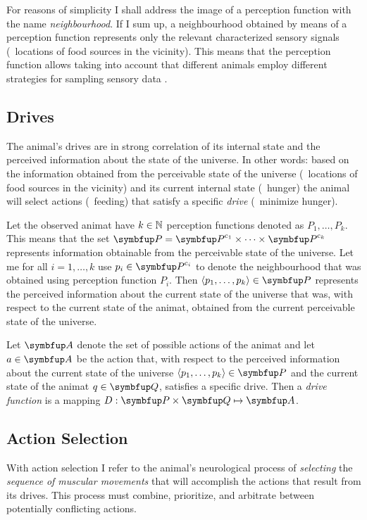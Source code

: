 For reasons of simplicity I shall address the image of a perception function with the name \emph{neighbourhood}. If I sum up, a neighbourhood obtained by means of a perception function represents only the relevant characterized sensory signals (\eg\ locations of food sources in the vicinity). This means that the perception function allows taking into account that different animals employ different strategies for sampling sensory data \cite{cliff:1993}. 

\subsection{Drives}
The animal's drives are in strong correlation of its internal state and the perceived information about the state of the universe. In other words: based on the information obtained from the perceivable state of the universe (\eg\ locations of food sources in the vicinity) and its current internal state (\eg\ hunger) the animal will select actions (\eg\ feeding) that satisfy a specific \emph{drive} (\eg\ minimize hunger).

Let the observed animat have $k \in \mathbb{N}$ perception functions denoted as $P_1,\ldots,P_k$. This means that the set $\set{P}=\set{P}^{\mathrm{c}_1} \times \cdots \times \set{P}^{\mathrm{c}_k}$ represents information obtainable from the perceivable state of the universe. Let me for all $i=1,\ldots,k$ use $p_i \in  \set{P}^{\mathrm{c}_i}$ to denote the neighbourhood that was obtained using perception function $P_i$. Then $\langle p_1,\ldots,p_k\rangle \in \set{P}$ represents the perceived information about the current state of the universe that was, with respect to the current state of the animat, obtained from the current perceivable state of the universe. 

\begin{definition}
	\label{def:animat:Dj}
	Let $\set{A}$ denote the set of possible actions of the animat and let $a \in \set{A}$ be the action that, with respect to the perceived information about the current state of the universe $\langle p_1,\ldots,p_k\rangle \in \set{P}$ and the current state of the animat $q \in \set{Q}$, satisfies a specific drive. Then a \emph{drive function} is a mapping $D: \set{P} \times \set{Q} \mapsto \set{A}$.
\end{definition}

\subsection{Action Selection}
With action selection I refer to the animal's neurological process of \emph{selecting} the \emph{sequence of muscular movements} that will accomplish the actions that result from its drives. This process must combine, prioritize, and arbitrate between potentially conflicting actions. 

